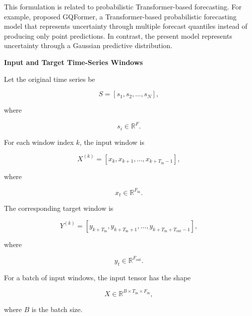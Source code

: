 \documentclass{book}
\providecommand{\ProjectDeepHeading}[2]{%
    \par\medskip\noindent\textbf{#2}\par\smallskip
}
\begin{document}
        This formulation is related to probabilistic Transformer-based forecasting. For example, \cite{jawed-2022-gqformer-a-multi-quantile-generative-transformer-for-time-series-forecasting} proposed GQFormer, a Transformer-based probabilistic forecasting model that represents uncertainty through multiple forecast quantiles instead of producing only point predictions. In contrast, the present model represents uncertainty through a Gaussian predictive distribution.
    
    
    \ProjectDeepHeading{8}{Input and Target Time-Series Windows}
        
        Let the original time series be
        
        \[
            S
            =
            \left[
                s_1,
                s_2,
                \ldots,
            s_N
            \right],
        \]
        
        where
        
        \[
            s_i
            \in
            \mathbb{R}^{F}.
        \]
        
        For each window index \(k\), the input window is
        
        \[
            X^{(k)}
            =
            \left[
                x_k,
                x_{k+1},
                \ldots,
            x_{k+T_{\mathrm{in}}-1}
            \right],
        \]
        
        where
        
        \[
            x_t
            \in
            \mathbb{R}^{F_{\mathrm{in}}}.
        \]
        
        The corresponding target window is
        
        \[
            Y^{(k)}
            =
            \left[
                y_{k+T_{\mathrm{in}}},
            y_{k+T_{\mathrm{in}}+1},
                \ldots,
            y_{k+T_{\mathrm{in}}+T_{\mathrm{out}}-1}
            \right],
        \]
        
        where
        
        \[
            y_t
            \in
            \mathbb{R}^{F_{\mathrm{out}}}.
        \]
        
        For a batch of input windows, the input tensor has the shape
        
        \[
            X
            \in
            \mathbb{R}^{B \times T_{\mathrm{in}} \times F_{\mathrm{in}}},
        \]
        
        where \(B\) is the batch size.
        
\end{document}
